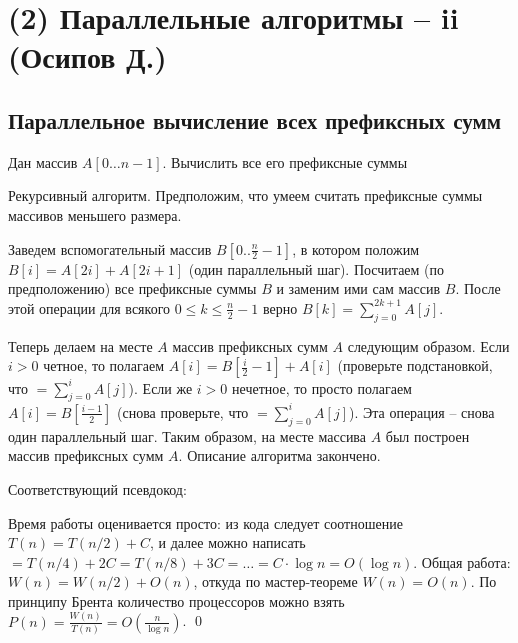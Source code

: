\section{(2) Параллельные алгоритмы -- ii (Осипов Д.)}
\subsection{Параллельное вычисление всех префиксных сумм}\label{parallel_sums}
\begin{problem*}
	Дан массив $A[0\ldots n-1]$. Вычислить все его префиксные суммы
\end{problem*}

 Рекурсивный алгоритм. Предположим, что умеем считать префиксные суммы массивов меньшего размера.

Заведем вспомогательный массив $B[0..\frac{n}{2}-1]$, в котором положим $B[i]=A[2i]+A[2i+1]$ (один параллельный шаг). Посчитаем (по предположению) все префиксные суммы $B$ и заменим ими сам массив $B$. После этой операции для всякого $0 \leq k \leq \frac{n}{2}-1$ верно $B[k] = \sum_{j=0}^{2k+1} A[j]$.

Теперь делаем на месте $A$ массив префиксных сумм $A$ следующим образом. Если $i > 0$ четное, то полагаем $A[i] = B[\frac{i}{2}-1] + A[i]$ (проверьте подстановкой, что $=\sum_{j=0}^{i}A[j]$). Если же $i > 0$ нечетное, то просто полагаем $A[i] = B[\frac{i-1}{2}]$ (снова проверьте, что $=\sum_{j=0}^{i}A[j]$). Эта операция -- снова один параллельный шаг. Таким образом, на месте массива $A$ был построен массив префиксных сумм $A$. Описание алгоритма закончено.

Соответствующий псевдокод:

\begin{algorithm}[H]
	\DontPrintSemicolon
\end{algorithm}

Время работы оценивается просто: из кода следует соотношение $T(n) = T(n/2) + C$, и далее можно написать $= T(n/4) + 2C = T(n/8) + 3C = \ldots = C\cdot\log n = O(\log n)$. Общая работа: $W(n) = W(n/2) + O(n)$, откуда по мастер-теореме $W(n) = O(n)$. По принципу Брента количество процессоров можно взять $P(n) = \frac{W(n)}{T(n)} = O(\frac{n}{\log n})$. \qed


